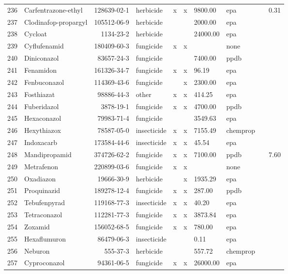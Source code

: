 \begin{longtable}{lp{3cm}rlp{0.5cm}p{0.5cm}p{1cm}p{1cm}p{1cm}p{1cm}}
  236 & Carfentrazone-ethyl & 128639-02-1 & herbicide & x & x & 9800.00 & epa &  & 0.31 \\ 
  237 & Clodinafop-propargyl & 105512-06-9 & herbicide &  &  & 2000.00 & epa &  &  \\ 
  238 & Cycloat & 1134-23-2 & herbicide &  &  & 24000.00 & epa &  &  \\ 
  239 & Cyflufenamid & 180409-60-3 & fungicide & x & x &  & none &  &  \\ 
  240 & Diniconazol & 83657-24-3 & fungicide &  &  & 7400.00 & ppdb &  &  \\ 
  241 & Fenamidon & 161326-34-7 & fungicide & x & x & 96.19 & epa &  &  \\ 
  242 & Fenbuconazol & 114369-43-6 & fungicide &  & x & 2300.00 & epa &  &  \\ 
  243 & Fosthiazat & 98886-44-3 & other & x & x & 414.25 & epa &  &  \\ 
  244 & Fuberidazol & 3878-19-1 & fungicide & x & x & 4700.00 & ppdb &  &  \\ 
  245 & Hexaconazol & 79983-71-4 & fungicide &  &  & 3549.63 & epa &  &  \\ 
  246 & Hexythiazox & 78587-05-0 & insecticide & x & x & 7155.49 & chemprop &  &  \\ 
  247 & Indoxacarb & 173584-44-6 & insecticide & x & x & 45.54 & epa &  &  \\ 
  248 & Mandipropamid & 374726-62-2 & fungicide & x & x & 7100.00 & ppdb &  & 7.60 \\ 
  249 & Metrafenon & 220899-03-6 & fungicide & x & x &  & none &  &  \\ 
  250 & Oxadiazon & 19666-30-9 & herbicide &  & x & 1935.29 & epa &  &  \\ 
  251 & Proquinazid & 189278-12-4 & fungicide & x & x & 287.00 & ppdb &  &  \\ 
  252 & Tebufenpyrad & 119168-77-3 & insecticide & x & x & 40.20 & epa &  &  \\ 
  253 & Tetraconazol & 112281-77-3 & fungicide & x & x & 3873.84 & epa &  &  \\ 
  254 & Zoxamid & 156052-68-5 & fungicide & x & x & 780.00 & epa &  &  \\ 
  255 & Hexaflumuron & 86479-06-3 & insecticide &  &  & 0.11 & epa &  &  \\ 
  256 & Neburon & 555-37-3 & herbicide &  &  & 557.72 & chemprop &  &  \\ 
  257 & Cyproconazol & 94361-06-5 & fungicide & x & x & 26000.00 & epa &  &  \\ 

\end{longtable}
